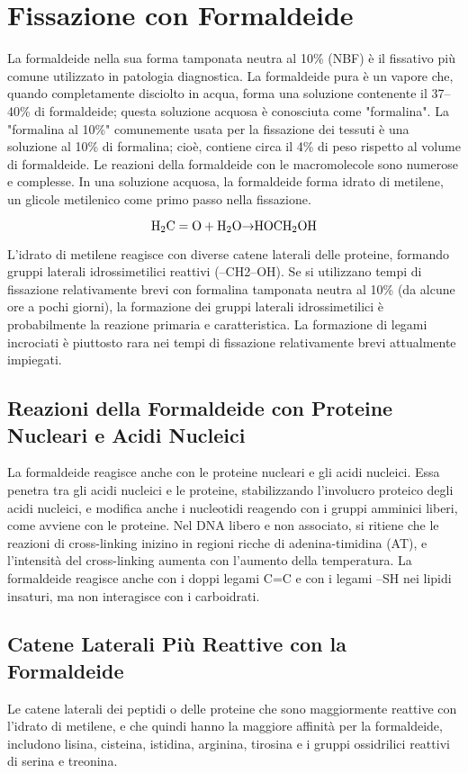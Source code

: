 \section{Fissazione con Formaldeide}
La formaldeide nella sua forma tamponata neutra al 10\% (NBF) è il fissativo più comune utilizzato in patologia diagnostica. La formaldeide pura è un vapore che, quando completamente disciolto in acqua, forma una soluzione contenente il 37–40\% di formaldeide; questa soluzione acquosa è conosciuta come "formalina". La "formalina al 10\%" comunemente usata per la fissazione dei tessuti è una soluzione al 10\% di formalina; cioè, contiene circa il 4\% di peso rispetto al volume di formaldeide. Le reazioni della formaldeide con le macromolecole sono numerose e complesse.  In una soluzione acquosa, la formaldeide forma idrato di metilene, un glicole metilenico come primo passo nella fissazione.

\[
\text{H}_2\text{C} = \text{O} + \text{H}_2\text{O\textrightarrow HOCH}_2\text{OH}
\]

L'idrato di metilene reagisce con diverse catene laterali delle proteine, formando gruppi laterali idrossimetilici reattivi (–CH2–OH). Se si utilizzano tempi di fissazione relativamente brevi con formalina tamponata neutra al 10\% (da alcune ore a pochi giorni), la formazione dei gruppi laterali idrossimetilici è probabilmente la reazione primaria e caratteristica. La formazione di legami incrociati è piuttosto rara nei tempi di fissazione relativamente brevi attualmente impiegati.

\subsection{Reazioni della Formaldeide con Proteine Nucleari e Acidi Nucleici}
La formaldeide reagisce anche con le proteine nucleari e gli acidi nucleici. Essa penetra tra gli acidi nucleici e le proteine, stabilizzando l'involucro proteico degli acidi nucleici, e modifica anche i nucleotidi reagendo con i gruppi amminici liberi, come avviene con le proteine. Nel DNA libero e non associato, si ritiene che le reazioni di cross-linking inizino in regioni ricche di adenina-timidina (AT), e l'intensità del cross-linking aumenta con l'aumento della temperatura. La formaldeide reagisce anche con i doppi legami C=C e con i legami –SH nei lipidi insaturi, ma non interagisce con i carboidrati.

\subsection{Catene Laterali Più Reattive con la Formaldeide}
Le catene laterali dei peptidi o delle proteine che sono maggiormente reattive con l'idrato di metilene, e che quindi hanno la maggiore affinità per la formaldeide, includono lisina, cisteina, istidina, arginina, tirosina e i gruppi ossidrilici reattivi di serina e treonina.


